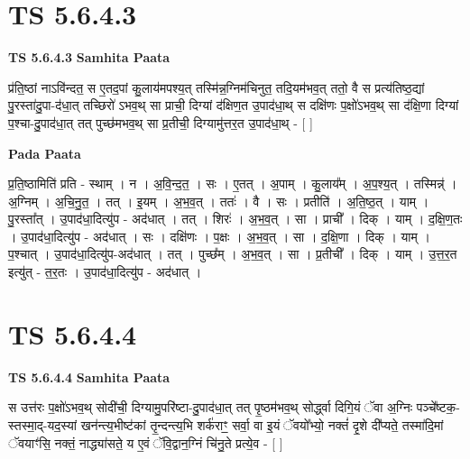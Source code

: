 \documentclass[17pt]{extarticle}
\begin{document}
\section*{ TS 5.6.4.3 }

\textbf{TS 5.6.4.3 } \newline
\textbf{Samhita Paata} \newline

प्र॑ति॒ष्ठां नाऽवि॑न्दत॒ स ए॒तद॒पां कु॒लाय॑मपश्य॒त् तस्मि॑न्न॒ग्निम॑चिनुत॒ तदि॒यम॑भव॒त् ततो॒ वै स प्रत्य॑तिष्ठ॒द्यां पु॒रस्ता॑दु॒पा-द॑धा॒त् तच्छिरो॑ ऽभव॒थ् सा प्राची॒ दिग्यां द॑क्षिण॒त उ॒पाद॑धा॒थ् स दक्षि॑णः प॒क्षो॑ऽभव॒थ् सा द॑क्षि॒णा दिग्यां प॒श्चा-दु॒पाद॑धा॒त् तत् पुच्छ॑मभव॒थ् सा प्र॒तीची॒ दिग्यामु॑त्तर॒त उ॒पाद॑धा॒थ् - [  ] \newline

\textbf{Pada Paata} \newline

प्र॒ति॒ष्ठामिति॑ प्रति - स्थाम् । न । अ॒वि॒न्द॒त॒ । सः । ए॒तत् । अ॒पाम् । कु॒लाय᳚म् । अ॒प॒श्य॒त् । तस्मिन्न्॑ । अ॒ग्निम् । अ॒चि॒नु॒त॒ । तत् । इ॒यम् । अ॒भ॒व॒त् । ततः॑ । वै । सः । प्रतीति॑ । अ॒ति॒ष्ठ॒त् । याम् । पु॒रस्ता᳚त् । उ॒पाद॑धा॒दित्यु॑प - अद॑धात् । तत् । शिरः॑ । अ॒भ॒व॒त् । सा । प्राची᳚ । दिक् । याम् । द॒क्षि॒ण॒तः । उ॒पाद॑धा॒दित्यु॑प - अद॑धात् । सः । दक्षि॑णः । प॒क्षः । अ॒भ॒व॒त् । सा । द॒क्षि॒णा । दिक् । याम् । प॒श्चात् । उ॒पाद॑धा॒दित्यु॑प-अद॑धात् । तत् । पुच्छ᳚म् । अ॒भ॒व॒त् । सा । प्र॒तीची᳚ । दिक् । याम् । उ॒त्त॒र॒त इत्यु॑त् - त॒र॒तः । उ॒पाद॑धा॒दित्यु॑प - अद॑धात् ।  \newline




\section*{ TS 5.6.4.4 }

\textbf{TS 5.6.4.4 } \newline
\textbf{Samhita Paata} \newline

स उत्त॑रः प॒क्षो॑ऽभव॒थ् सोदी॑ची॒ दिग्यामु॒परि॑ष्टा-दु॒पाद॑धा॒त् तत् पृ॒ष्ठम॑भव॒थ् सोर्द्ध्वा दिगि॒यं ॅवा अ॒ग्निः पञ्चे᳚ष्टक॒-स्तस्मा॒द्-यद॒स्यां खन॑न्त्य॒भीष्ट॑कां तृ॒न्दन्त्य॒भि शर्क॑राꣳ॒॒ सर्वा॒ वा इ॒यं ॅवयो᳚भ्यो॒ नक्तं॑ दृ॒शे दी᳚प्यते॒ तस्मा॑दि॒मां ॅवयाꣳ॑सि॒ नक्तं॒ नाद्ध्या॑सते॒ य ए॒वं ॅवि॒द्वान॒ग्निं चि॑नु॒ते प्रत्ये॒व - [  ] \newline
\end{document}
